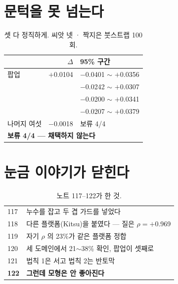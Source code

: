 \documentclass[10pt]{article}
\begin{document}

\section{문턱을 못 넘는다}

\begin{table}[t]
\centering\tsize
\caption{셋 다 정직하게. 씨앗 넷 · 짝지은 붓스트랩 100회.}
\begin{tabular}{lrl}
\toprule
& $\Delta$ & 95\% 구간 \\
\midrule
팝업 & $+$0.0104 & $-$0.0401 $\sim$ $+$0.0356 \\
& & $-$0.0242 $\sim$ $+$0.0307 \\
& & $-$0.0200 $\sim$ $+$0.0341 \\
& & $-$0.0207 $\sim$ $+$0.0379 \\
나머지 여섯 & $-$0.0018 & 보류 4/4 \\
\midrule
\multicolumn{3}{l}{\textbf{보류 4/4 --- 채택하지 않는다}} \\
\bottomrule
\end{tabular}
\end{table}


\section{눈금 이야기가 닫힌다}

\begin{table}[t]
\centering\tsize
\caption{노트 117--122가 한 것.}
\begin{tabular}{ll}
\toprule
117 & 누수를 잡고 두 겹 가드를 넣었다 \\
118 & 다른 플랫폼(Kitsu)을 붙였다 --- 질은 $\rho{=}+$0.969 \\
119 & 자기 $\rho$ 의 23\%가 같은 플랫폼 정합 \\
120 & 세 도메인에서 21$\sim$38\% 확인, 팝업이 셋째로 \\
121 & 법칙 1은 서고 법칙 2는 반토막 \\
\textbf{122} & \textbf{그런데 모형은 안 좋아진다} \\
\bottomrule
\end{tabular}
\end{table}
\end{document}
